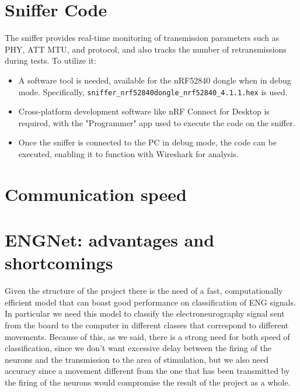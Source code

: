 \documentclass{Configuration_Files/PoliMi3i_thesis}
\begin{document}
\section*{Sniffer Code}
The sniffer provides real-time monitoring of transmission parameters such as PHY, ATT MTU, and protocol, and also tracks the number of retransmissions during tests. To utilize it:
\begin{itemize}
    \item A software tool is needed, available for the nRF52840 dongle when in debug mode. Specifically, \texttt{sniffer\_nrf52840dongle\_nrf52840\_4.1.1.hex} is used.
    \item Cross-platform development software like nRF Connect for Desktop is required, with the "Programmer" app used to execute the code on the sniffer.
    \item Once the sniffer is connected to the PC in debug mode, the code can be executed, enabling it to function with Wireshark for analysis.
\end{itemize}

\section{Communication speed}

\section{ENGNet: advantages and shortcomings}

Given the structure of the project there is the need of a fast, computationally efficient model that can boast good performance on classification of ENG signals.
In particular we need this model to classify the electroneurography signal sent from the board to the computer in different classes that correspond to different movements.
Because of this, as we said, there is a strong need for both speed of classification, since we don't want excessive delay between the firing of the neurons and the transmission to the area of stimulation, but we also need accuracy since a movement different from the one that has been transmitted by the firing of the neurons would compromise the result of the project as a whole.
\end{document}
